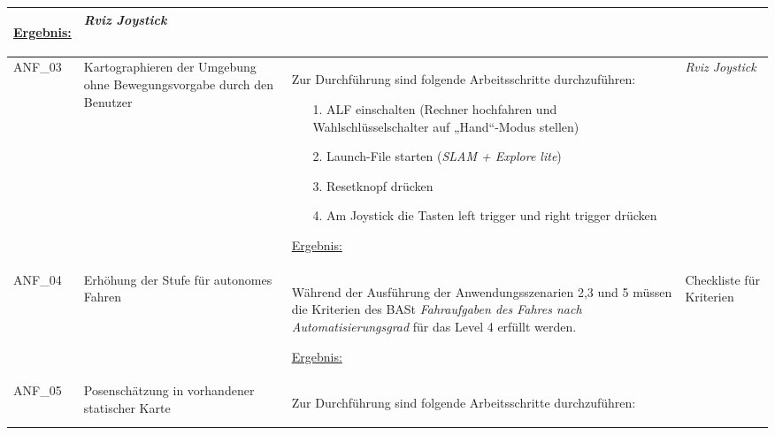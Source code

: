 \documentclass[12pt,a4paper,oneside,numbers=noenddot,captions=tableheading,toc=bibliography,openany,tikz,margin=5mm]{scrbook}
\begin{document}
\begin{longtable}{|p{}|p{}|p{7cm}|p{}|}
\begin{itemize}
	\end{itemize}
	
	\underline{Ergebnis:}\newline
   \newline
	
	\textbf{}%
	
	& \textit{Rviz \newline Joystick}\\
	\hline
	ANF\_03 & Kartographieren der Umgebung ohne Bewegungsvorgabe durch den Benutzer& Zur Durchführung sind folgende Arbeitsschritte durchzuführen:
	\begin{itemize}
		
		
		\item[1.]	ALF einschalten (Rechner hochfahren und Wahlschlüsselschalter auf „Hand“-Modus stellen)
		\item[2.]	Launch-File starten (\textit{SLAM + Explore lite})
		\item[3.]	Resetknopf drücken
		\item[4.]	Am Joystick die Tasten \glqq left trigger\grqq{} und \glqq right trigger\grqq{} drücken
		
	\end{itemize}
	
	\underline{Ergebnis:}\newline
	\newline
	
	\textbf{}%
	
	& \textit{Rviz \newline Joystick}\\
	\hline
	ANF\_04 & Erhöhung der Stufe für autonomes Fahren & Während der Ausführung der Anwendungsszenarien 2,3 und 5 müssen die Kriterien des BASt \textit{Fahraufgaben des Fahres nach Automatisierungsgrad} für das Level 4 erfüllt werden. \newline
	
	\underline{Ergebnis:}\newline
	
	\textbf{} %
	& 	Checkliste für Kriterien
	\\
	\hline
	ANF\_05 & Posenschätzung in vorhandener statischer Karte & Zur Durchführung sind folgende Arbeitsschritte durchzuführen:
	\begin{itemize}
		

\end{itemize}
\end{longtable}
\end{document}
